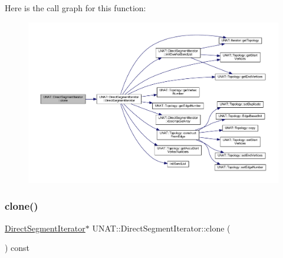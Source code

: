 Here is the call graph for this function\+:
\nopagebreak
\begin{figure}[H]
\begin{center}
\leavevmode
\includegraphics[width=350pt]{classUNAT_1_1DirectSegmentIterator_a998b5eef5895e387e54811ef3f5ffd84_cgraph}
\end{center}
\end{figure}
\mbox{\label{classUNAT_1_1DirectSegmentIterator_a998b5eef5895e387e54811ef3f5ffd84}} 
\subsubsection{\texorpdfstring{clone()}{clone()}\hspace{0.1cm}{\footnotesize\ttfamily [2/2]}}
{\footnotesize\ttfamily \mbox{\hyperlink{classUNAT_1_1DirectSegmentIterator}{Direct\+Segment\+Iterator}}$\ast$ U\+N\+A\+T\+::\+Direct\+Segment\+Iterator\+::clone (\begin{DoxyParamCaption}{ }\end{DoxyParamCaption}) const\hspace{0.3cm}{\ttfamily [inline]}}

